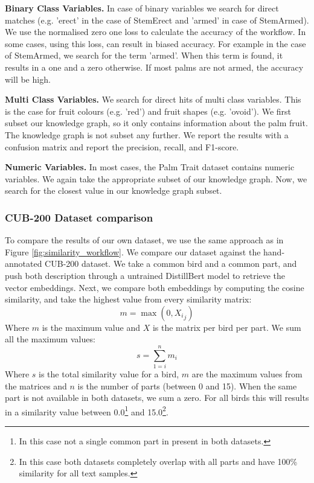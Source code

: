 \documentclass[a4paper, 12pt, oneside]{book} %
\begin{document}
\noindent
\textbf{Binary Class Variables.}
In case of binary variables we search for direct matches (e.g. 'erect' in the case of StemErect and 'armed' in case of StemArmed).
We use the normalised zero one loss \autocite{sammut_zero-one_2010} to calculate the accuracy of the workflow.
In some cases, using this loss, can result in biased accuracy.
For example in the case of StemArmed, we search for the term 'armed'. When this term is found, it results in a one and a zero otherwise. 
If most palms are not armed, the accuracy will be high.
\newline

\noindent
\textbf{Multi Class Variables.}
We search for direct hits of multi class variables.
This is the case for fruit colours (e.g. 'red') and fruit shapes (e.g. 'ovoid').
We first subset our knowledge graph, so it only contains information about the palm fruit. 
The knowledge graph is not subset any further.
We report the results with a confusion matrix and report the precision, recall, and F1-score.
\newline

\noindent
\textbf{Numeric Variables.}
In most cases, the Palm Trait dataset contains numeric variables.
We again take the appropriate subset of our knowledge graph.
Now, we search for the closest value in our knowledge graph subset.

\subsubsection{CUB-200 Dataset comparison}
To compare the results of our own dataset, we use the same approach as in Figure \ref{fig:similarity_workflow}.
We compare our dataset against the hand-annotated CUB-200 dataset.
We take a common bird and a common part, and push both description through a untrained DistillBert model to retrieve the vector embeddings.
Next, we compare both embeddings by computing the cosine similarity, and take the highest value from every similarity matrix:
\begin{equation}
    m=\max(0,  {X_i}_j  )
\end{equation}
Where $m$ is the maximum value and $X$ is the matrix per bird per part.
We sum all the maximum values:
\begin{equation}
     s=\sum_{1=i}^{n} m_i
\end{equation}
Where $s$ is the total similarity value for a bird, $m$ are the maximum values from the matrices and $n$ is the number of parts (between 0 and 15).
When the same part is not available in both datasets, we sum a zero.
For all birds this will results in a similarity value between 0.0\footnote{In this case not a single common part in present in both datasets.} and 15.0\footnote{In this case both datasets completely overlap with all parts and have 100\% similarity for all text samples.}.
\end{document}
